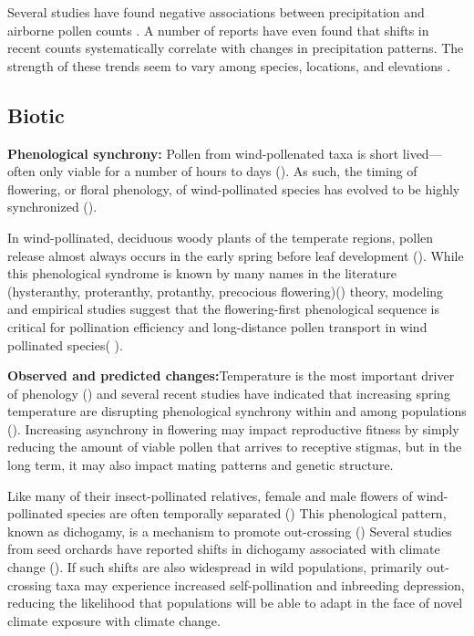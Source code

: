 \documentclass[12pt]{article}
\begin{document}
Several studies have found negative associations between precipitation and airborne pollen counts \citep{Grewling:2014aa,Gross2019,Pace:2018aa}. A number of reports have even found that shifts in recent counts systematically correlate with changes in precipitation patterns\citep{Zhang:2015, Bruffaerts:2018aa}. The strength of these trends seem to vary among species, locations, and elevations 
\citep{Knaap:2010aa,Pace:2018aa}.

\subsection*{Biotic}

\textbf{Phenological synchrony:} Pollen from wind-pollenated taxa is short lived--- often only viable for a number of hours to days (). As such, the timing of flowering, or floral phenology, of wind-pollinated species has evolved to be highly synchronized ().

In wind-pollinated, deciduous woody plants of the temperate regions, pollen release almost always occurs in the early spring before leaf development (). While this phenological syndrome is known by many names in the literature (hysteranthy, proteranthy, protanthy, precocious flowering)() theory, modeling and empirical studies suggest that the flowering-first phenological sequence is critical for pollination efficiency and long-distance pollen transport in wind pollinated species( ).

\textbf{Observed and predicted changes:}Temperature is the most important driver of phenology () and several recent studies have indicated that increasing spring temperature are disrupting phenological synchrony within and among populations (). Increasing asynchrony in flowering may impact reproductive fitness by simply reducing the amount of viable pollen that arrives to receptive stigmas, but in the long term, it may also impact mating patterns and genetic structure. 

Like many of their insect-pollinated relatives, female and male flowers of wind-pollinated species are often temporally separated () This phenological pattern, known as dichogamy, is a mechanism to promote out-crossing () Several studies from seed orchards have reported shifts in dichogamy associated with climate change (). If such shifts are also widespread in wild populations, primarily out-crossing taxa may experience increased self-pollination and inbreeding depression, reducing the likelihood that populations will be able to adapt in the face of novel climate exposure with climate change.
\end{document}
